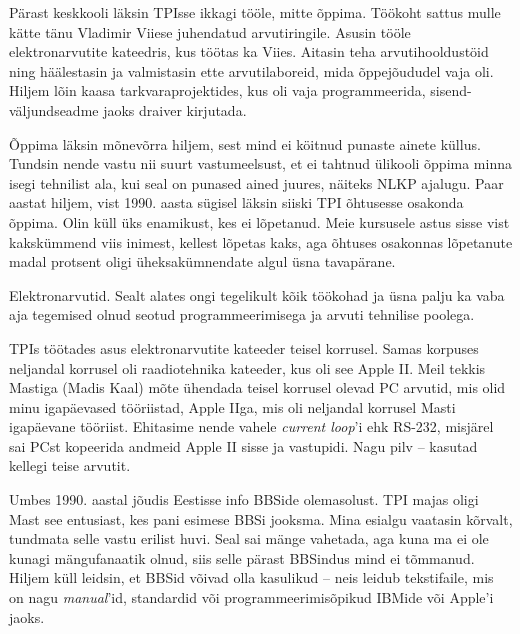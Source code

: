 
Pärast keskkooli läksin TPIsse ikkagi tööle, mitte õppima. Töökoht sattus mulle kätte tänu 
Vladimir Viiese juhendatud arvutiringile. 
Asusin tööle 
elektronarvutite kateedris, kus töötas ka Viies. Aitasin teha arvutihooldustöid ning 
häälestasin ja valmistasin ette arvutilaboreid, mida õppejõududel vaja oli. 
Hiljem lõin kaasa
tarkvaraprojektides, kus oli vaja programmeerida, 
sisend-väljundseadme jaoks draiver kirjutada. 


Õppima läksin mõnevõrra hiljem, sest mind ei köitnud
punaste ainete küllus. Tundsin 
nende vastu nii suurt vastumeelsust, et ei tahtnud ülikooli 
õppima minna isegi tehnilist ala, kui seal on punased ained juures, näiteks NLKP ajalugu. Paar aastat hiljem, vist 1990. aasta sügisel läksin siiski TPI õhtusesse osakonda õppima. Olin 
küll üks enamikust, kes ei lõpetanud. Meie kursusele astus sisse vist 
kakskümmend viis inimest, kellest lõpetas kaks, aga õhtuses osakonnas lõpetanute madal protsent oligi üheksakümnendate algul üsna tavapärane. 


Elektronarvutid. Sealt alates ongi tegelikult kõik töökohad ja üsna palju ka vaba aja tegemised olnud seotud programmeerimisega ja arvuti tehnilise poolega.

TPIs töötades asus elektronarvutite kateeder teisel korrusel. 
Samas korpuses neljandal korrusel oli raadiotehnika 
kateeder, kus oli see Apple II. Meil tekkis 
Mastiga (Madis Kaal) 
mõte ühendada teisel korrusel olevad PC arvutid, mis olid minu igapäevased tööriistad, 
Apple IIga, mis oli neljandal korrusel Masti igapäevane tööriist. 
Ehitasime nende vahele \emph{current loop}'i ehk RS-232, 
misjärel sai PCst kopeerida andmeid Apple II sisse ja vastupidi. 
Nagu pilv – kasutad kellegi teise arvutit. 

Umbes 1990. aastal jõudis Eestisse info BBSide olemasolust. TPI majas oligi Mast see 
entusiast, kes pani esimese BBSi jooksma. Mina esialgu vaatasin 
kõrvalt, tundmata selle vastu erilist huvi. Seal sai mänge vahetada, 
aga kuna ma ei ole kunagi mängufanaatik olnud, siis selle pärast
BBSindus mind ei tõmmanud. Hiljem küll 
leidsin, et BBSid võivad olla kasulikud – 
neis leidub tekstifaile, mis on nagu
\emph{manual}'id, standardid või
programmeerimisõpikud IBMide või Apple'i jaoks.

